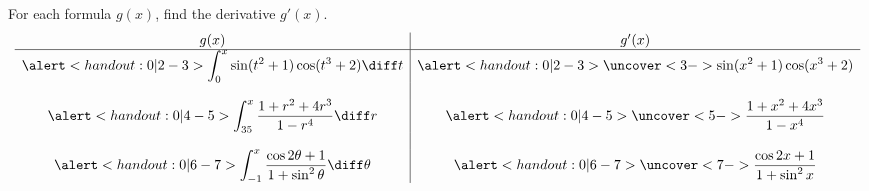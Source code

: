 \begin{frame}
\begin{example}
For each formula $g(x)$, find the derivative $g'(x)$.  
\[
\begin{array}{c|c}
g(x) & g'(x) \\
\hline
\alert<handout:0| 2-3>{\displaystyle \int_0^x \sin(t^2+1)\cos(t^3+2)\diff t} & %
\alert<handout:0| 2-3>{\uncover<3->{\displaystyle \sin(x^2+1)\cos(x^3+2)}} \\%
 & \\
\alert<handout:0| 4-5>{\displaystyle \int_{35}^x \frac{1+r^2+4r^3}{1-r^4}\diff r} & %
\alert<handout:0| 4-5>{\uncover<5->{\displaystyle \frac{1+x^2+4x^3}{1-x^4}}} \\%
 & \\
\alert<handout:0| 6-7>{\displaystyle \int_{-1}^x \frac{\cos 2\theta + 1}{1+\sin^2 \theta}\diff \theta} & %
\alert<handout:0| 6-7>{\uncover<7->{\displaystyle \frac{\cos 2x + 1}{1+\sin^2 x}}}%
\end{array}
\]
\end{example}
\end{frame}
